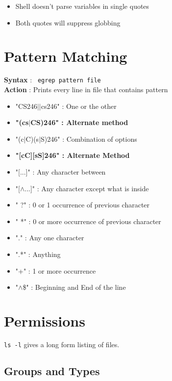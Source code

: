 \documentclass{article}
\newcommand{\pipe}{\(\mid\)}
\newcommand{\ctr}{\(\wedge\)}
\newenvironment{exblock}[1]{%
    \tcolorbox[beamer,%
    noparskip,breakable,
    colback=lightgreen,colframe=darkgreen,%
    colbacklower=limegreen!75!lightgreen,%
    title=#1]}%
    {\endtcolorbox}
\newenvironment{ablock}[1]{%
    \tcolorbox[beamer,%
    noparskip,breakable,
    colback=lightcoral,colframe=darkred,%
    colbacklower=tomato!75!lightcoral,%
    title=#1]}%
    {\endtcolorbox}
\begin{document}
\begin{itemize}
\item Shell doesn't parse variables in single quotes
\item Both quotes will suppress globbing
\end{itemize}

\section{Pattern Matching}

\textbf{Syntax}  : \verb| egrep pattern file| \\
\textbf{Action} : Prints every line in file that contains pattern

\begin{ablock}{Patterns}
\begin{itemize}
\item "CS246\pipe \pipe cs246"  : One or the other 
\item \textbf{"(cs\pipe CS)246" : Alternate method}
\item "(c\pipe C)(s\pipe S)246" : Combination of options
\item \textbf{"[cC][sS]246" : Alternate Method}
\item "[...]" : Any character between
\item "[\ctr ...]" : Any character except what is inside
\item " ?" : 0 or 1 occurrence of previous character 
\item " *" : 0 or more occurrence of previous character
\item "." : Any one character 
\item ".*" : Anything
\item "+" : 1 or more occurrence
\item "\ctr \$" : Beginning and End of the line   
\end{itemize}
\end{ablock} 

\section{Permissions}

\begin{exblock}{Additional Information}
\verb|ls -l| gives a long form listing of files.
\end{exblock}

\subsection{Groups and Types}
\end{document}
